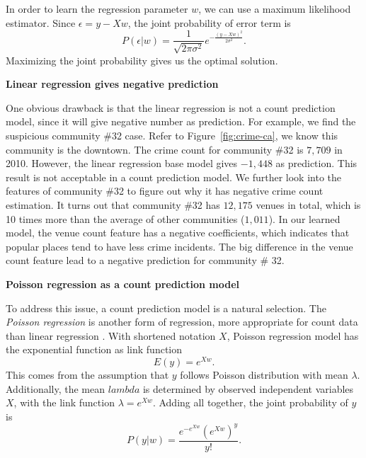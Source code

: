 In order to learn the regression parameter $w$, we can use a maximum likelihood estimator. Since $\epsilon = y - Xw$, the joint probability of error term is
\begin{equation}
P(\epsilon | w) = \frac{1}{\sqrt{2\pi \sigma^2}} e^{-\frac{(y - Xw)^2}{2 \sigma^2}}.
\end{equation}
Maximizing the joint probability gives us the optimal solution.



\textbf{Linear regression gives negative prediction}

One obvious drawback is that the linear regression is not a count prediction model, since it will give negative number as prediction. For example, we find the suspicious community \#32 case. Refer to Figure~\ref{fig:crime-ca}, we know this community is the downtown. The crime count for community \#32 is $7,709$ in 2010. However, the linear regression base model gives $-1,448$ as prediction. This result is not acceptable in a count prediction model. We further look into the features of community \#32 to figure out why it has negative crime count estimation. It turns out that community \#32 has $12,175$ venues in total, which is 10 times more than the average of other communities ($1,011$). In our learned model, the venue count feature has a negative coefficients, which indicates that popular places tend to have less crime incidents. The big difference in the venue count feature lead to a negative prediction for community \# 32.




\textbf{Poisson regression as a count prediction model}

To address this issue, a count prediction model is a natural selection. The \emph{Poisson regression} is another form of regression, more appropriate for count data than linear regression \cite{GMS95}\cite{Lamb92}. With shortened notation $X$, Poisson regression model has the exponential function as link function
\begin{equation}
\label{eq:prm}
E(y) = e^{X w}.
\end{equation}
This comes from the assumption that $y$ follows Poisson distribution with mean $\lambda $. Additionally, the mean $lambda$ is determined by observed independent variables $X$, with the link function $\lambda = e^{Xw}$. Adding all together, the joint probability of $y$ is 
\begin{equation}
P(y|w) = \frac{e^{-e^{Xw}}(e^{Xw})^y}{y!}.
\end{equation}


